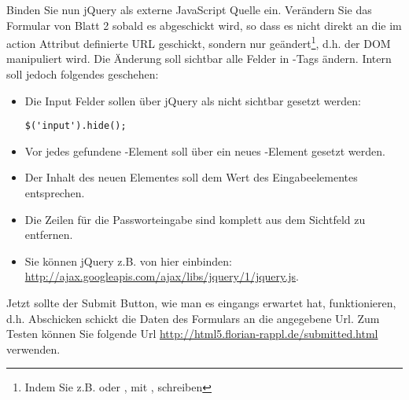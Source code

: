 %
\par Binden Sie nun jQuery als externe JavaScript Quelle ein. Verändern Sie das
Formular von Blatt 2 sobald es abgeschickt wird, so dass es nicht direkt an die
im action Attribut definierte URL geschickt, sondern nur geändert\footnote{Indem
Sie z.B.  oder
, mit
, schreiben}, d.h. der DOM
manipuliert wird. Die Änderung soll sichtbar alle  Felder in
-Tags ändern. Intern soll jedoch folgendes geschehen:
%
\begin{itemize}
\item
Die Input Felder sollen über jQuery als nicht sichtbar gesetzt werden:
%
\begin{lstlisting}
$('input').hide();
\end{lstlisting}
%
\item 
Vor jedes gefundene -Element soll über  ein
neues -Element gesetzt werden.
\item 
Der Inhalt des neuen Elementes soll dem Wert des Eingabeelementes entsprechen.
\item 
Die Zeilen für die Passworteingabe sind komplett aus dem Sichtfeld zu
entfernen.
\item 
Sie können jQuery z.B. von hier einbinden:
\url{http://ajax.googleapis.com/ajax/libs/jquery/1/jquery.js}.
\end{itemize}
%
\par Jetzt sollte der Submit Button, wie man es eingangs erwartet hat,
funktionieren, d.h. Abschicken schickt die Daten des Formulars an die
angegebene Url. Zum Testen können Sie folgende Url
\url{http://html5.florian-rappl.de/submitted.html} verwenden.